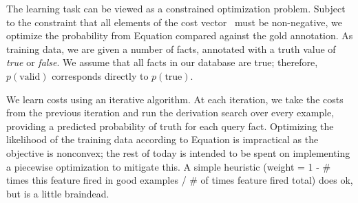 The learning task can be viewed as a constrained optimization problem.
Subject to the constraint that all elements of the cost vector \btheta\ 
  must be non-negative, we optimize the probability from
  Equation  compared against the gold annotation.
As training data, we are given a number of facts, annotated with a
  truth value of \textit{true} or \textit{false}.
We assume that all facts in our database are true; therefore,
  $p(\textrm{valid})$ corresponds directly to $p(\textrm{true})$.

We learn costs using an iterative algorithm.
At each iteration, we take the costs from the previous iteration
  and run the derivation search over every example, providing
  a predicted probability of truth for each query fact.
Optimizing the likelihood of the training data according to
  Equation  is impractical as the objective is nonconvex;
  the rest of today is intended to be spent on implementing a piecewise
  optimization to mitigate this.
A simple heuristic (weight = 1 - \# times this feature fired in good examples
  / \# of times feature fired total) does ok, but is a little braindead.

%
